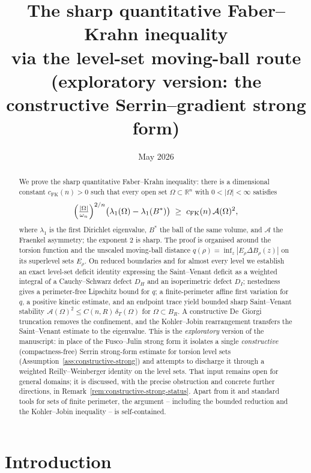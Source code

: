 \documentclass[11pt]{amsart}
\title[Quantitative Faber--Krahn: constructive Serrin route (exploratory)]
{The sharp quantitative Faber--Krahn inequality\\
via the level-set moving-ball route\\[2pt]
{\large\normalfont(exploratory version: the constructive Serrin--gradient strong form)}}
\author{}
\date{May 2026}
\theoremstyle{definition}
\newcommand{\R}{\mathbb R}
\newcommand{\Om}{\Omega}
\newcommand{\Fr}{\mathcal A}
\newcommand{\dT}{\delta_T}
\newcommand{\Bstar}{B^*}
\begin{document}
\begin{abstract}
We prove the sharp quantitative Faber--Krahn inequality: there is a dimensional
constant \(c_{\mathrm{FK}}(n)>0\) such that every open set \(\Om\subset\R^n\)
with \(0<|\Om|<\infty\) satisfies
\[
   \Bigl(\tfrac{|\Om|}{\omega_n}\Bigr)^{2/n}
   \bigl(\lambda_1(\Om)-\lambda_1(\Bstar)\bigr)
   \;\ge\; c_{\mathrm{FK}}(n)\,\Fr(\Om)^2 ,
\]
where \(\lambda_1\) is the first Dirichlet eigenvalue, \(\Bstar\) the ball of
the same volume, and \(\Fr\) the Fraenkel asymmetry; the exponent \(2\) is
sharp.  The proof is organised around the torsion function and the unscaled
moving-ball distance \(q(\rho)=\inf_{z}|E_\rho\Delta B_\rho(z)|\) on its
superlevel sets \(E_\rho\).  On reduced boundaries and for almost every level we
establish an exact level-set deficit identity expressing the Saint--Venant
deficit as a weighted integral of a Cauchy--Schwarz defect \(D_H\) and an
isoperimetric defect \(D_I\); nestedness gives a perimeter-free Lipschitz bound
for \(q\); a finite-perimeter affine first variation for \(q\), a positive
kinetic estimate, and an endpoint trace yield bounded sharp Saint--Venant
stability \(\Fr(\Om)^2\le C(n,R)\,\dT(\Om)\) for \(\Om\subset B_R\).  A
constructive De~Giorgi truncation removes the confinement, and the
Kohler--Jobin rearrangement transfers the Saint--Venant estimate to the
eigenvalue.  This is the \emph{exploratory} version of the manuscript: in place
of the Fusco--Julin strong form it isolates a single \emph{constructive}
(compactness-free) Serrin strong-form estimate for torsion level sets
(Assumption~\ref{ass:constructive-strong}) and attempts to discharge it through a
weighted Reilly--Weinberger identity on the level sets.  That input remains open
for general domains; it is discussed, with the precise obstruction and concrete
further directions, in Remark~\ref{rem:constructive-strong-status}.  Apart from
it and standard tools for sets of finite perimeter, the argument -- including the
bounded reduction and the Kohler--Jobin inequality -- is self-contained.
\end{abstract}

\maketitle
\tableofcontents

\section{Introduction}\label{sec:intro}
\end{document}
